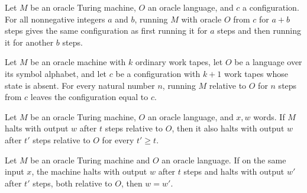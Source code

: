 \begin{theorem}
\label{Turing.OracleTM.runFrom_add}
\leanok
{}
Let $M$ be an oracle Turing machine, $O$ an oracle language, and $c$ a configuration.
For all nonnegative integers $a$ and $b$, running $M$ with oracle $O$ from $c$ for $a+b$
steps gives the same configuration as first running it for $a$ steps and then running it
for another $b$ steps.
\end{theorem}

\begin{theorem}
\label{Turing.OracleTM.runFrom_of_halt}
\leanok
{}
Let $M$ be an oracle machine with $k$ ordinary work tapes, let $O$ be a language over
its symbol alphabet, and let $c$ be a configuration with $k+1$ work tapes whose state is
absent. For every natural number $n$, running $M$ relative to $O$ for $n$ steps from $c$
leaves the configuration equal to $c$.
\end{theorem}

\begin{theorem}
\label{Turing.OracleTM.ComputesInTime.mono}
\leanok
{}
Let $M$ be an oracle Turing machine, $O$ an oracle language, and $x,w$ words. If $M$
halts with output $w$ after $t$ steps relative to $O$, then it also halts with output
$w$ after $t'$ steps relative to $O$ for every $t'\ge t$.
\end{theorem}

\begin{theorem}
\label{Turing.OracleTM.ComputesInTime.output_unique}
\leanok
{}
Let $M$ be an oracle Turing machine and $O$ an oracle language. If on the same input
$x$, the machine halts with output $w$ after $t$ steps and halts with output $w'$ after
$t'$ steps, both relative to $O$, then $w=w'$.
\end{theorem}

